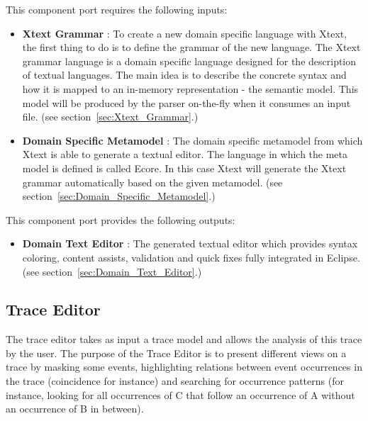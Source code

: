 \documentclass{gemoc} %
\begin{document}
This component port requires the following inputs:
\begin{itemize}
  \item \textbf{Xtext Grammar} :
To create a new domain specific language with Xtext, the first thing to do is to define the grammar of the new language. The Xtext grammar language is a domain specific language designed for the description of textual languages. The main idea is to describe the concrete syntax and how it is mapped to an in-memory representation - the semantic model. This model will be produced by the parser on-the-fly when it consumes an input file.
(see section~\ref{sec:Xtext_Grammar}.)
  \item \textbf{Domain Specific Metamodel} :
The domain specific metamodel from which Xtext is able to generate a textual editor. The language in which the meta model is defined is called Ecore. In this case Xtext will generate the Xtext grammar automatically based on the given metamodel.
(see section~\ref{sec:Domain_Specific_Metamodel}.)
\end{itemize}

This component port provides the following outputs:
\begin{itemize}
  \item \textbf{Domain Text Editor} :
The generated textual editor which provides syntax coloring, content assists, validation and quick fixes fully integrated in Eclipse.
(see section~\ref{sec:Domain_Text_Editor}.)
\end{itemize}




\subsection{Trace Editor}
\label{sec:Trace_Editor}
The trace editor takes as input a trace model and allows the analysis of this trace by the user.
The purpose of the Trace Editor is to present different views on a trace by masking some events, highlighting relations between event occurrences in the trace (coincidence for instance) and searching for occurrence patterns (for instance, looking for all occurrences of C that follow an occurrence of A without an occurrence of B in between).
 
\end{document}
